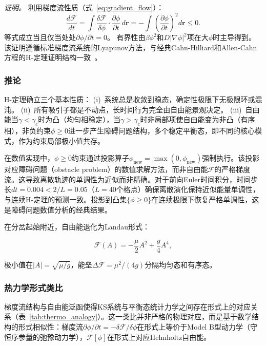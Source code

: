 \documentclass[sn-nature,pdflatex]{sn-jnl}
\begin{document}
\noindent\textit{证明。}
利用梯度流性质（式~\ref{eq:gradient_flow}）：
\begin{equation}
\frac{d\mathcal{F}}{dt} = \int \frac{\delta\mathcal{F}}{\delta\phi} \cdot \frac{\partial\phi}{\partial t} \, d\mathbf{r}
= -\int \left(\frac{\partial\phi}{\partial t}\right)^2 d\mathbf{r} \leq 0.
\end{equation}
等式成立当且仅当处处$\partial\phi/\partial t = 0$。
有界性由$\beta\phi^2$和$D|\nabla\phi|^2$项在大$\phi$时主导得到。该证明遵循标准梯度流系统的Lyapunov方法，与经典Cahn-Hilliard和Allen-Cahn方程的H-定理证明结构一致~\cite{chaikin_lubensky_1995}。

\subsubsection{推论}

H-定理确立三个基本性质：
(i)~系统总是收敛到稳态，确定性极限下无极限环或混沌。
(ii)~所有吸引子都是不动点，长时间行为完全由自由能景观决定。
(iii)~自由能当$\gamma < \gamma_c$时为凸（均匀相稳定），当$\gamma > \gamma_c$时非局部项使自由能变为非凸（有序相），非负约束$\phi \geq 0$进一步产生障碍问题结构，多个稳定平衡态，即不同的核心模式，作为约束局部极小值共存。

在数值实现中，$\phi \geq 0$约束通过投影算子$\phi_{\text{new}} = \max(0, \phi_{\text{new}})$强制执行。该投影对应障碍问题（obstacle problem）的数值求解方法，而非自由能$\mathcal{F}$的严格梯度流。这导致离散轨迹的单调性为近似而非精确。对于前向Euler时间积分，时间步长$dt = 0.004 < 2/L = 0.05$（$L = 40$个格点）确保离散演化保持近似能量单调性，与连续H-定理的预测一致。投影到凸集$\{\phi \geq 0\}$在连续极限下恢复严格单调性，这是障碍问题数值分析的经典结果。

在分岔起始附近，自由能退化为Landau形式：

\begin{equation}
\mathcal{F}(A) = -\frac{\mu}{2} A^2 + \frac{g}{4} A^4,
\end{equation}

极小值在$|A| = \sqrt{\mu/g}$，能垒$\Delta\mathcal{F} = \mu^2/(4g)$分隔均匀态和有序态。

\subsubsection{热力学形式类比}

梯度流结构与自由能泛函使得KS系统与平衡态统计力学之间存在形式上的对应关系（表~\ref{tab:thermo_analogy}）。这一类比并非严格的物理对应，而是基于数学结构的形式相似性：梯度流$\partial\phi/\partial t = -\delta\mathcal{F}/\delta\phi$在形式上等价于Model B型动力学（守恒序参量的弛豫动力学），$\mathcal{F}[\phi]$在形式上对应Helmholtz自由能。
\end{document}
